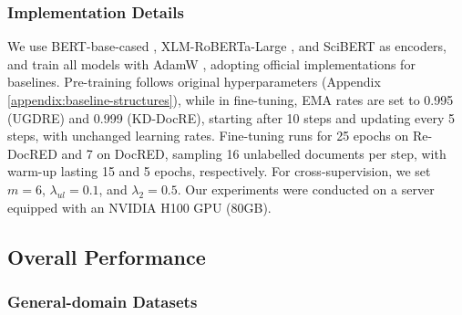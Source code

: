 \subsubsection{Implementation Details}
We use BERT-base-cased \citep{devlin2019bert}, XLM-RoBERTa-Large \cite{conneau2020unsupervised}, and SciBERT \cite{beltagy2019scibert} as encoders, and train all models with AdamW \citep{loshchilov2019decoupled}, adopting official implementations for baselines. Pre-training follows original hyperparameters (Appendix \ref{appendix:baseline-structures}), while in fine-tuning, EMA rates are set to 0.995 (UGDRE) and 0.999 (KD-DocRE), starting after 10 steps and updating every 5 steps, with unchanged learning rates. Fine-tuning runs for 25 epochs on Re-DocRED and 7 on DocRED, sampling 16 unlabelled documents per step, with warm-up lasting 15 and 5 epochs, respectively. For cross-supervision, we set $m = 6$, $\lambda_{ul} = 0.1$, and $\lambda_2 = 0.5$. Our experiments were conducted on a server equipped with an NVIDIA H100 GPU (80GB).

\subsection{Overall Performance}
\subsubsection{General-domain Datasets}
